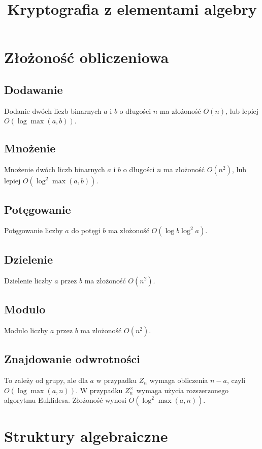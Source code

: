 \documentclass{../notatki}
\title{Kryptografia z elementami algebry}
\begin{document}
\tableofcontents

\section{Złożoność obliczeniowa}

\subsection{Dodawanie}

Dodanie dwóch liczb binarnych $a$ i $b$ o długości $n$ ma złożoność $O(n)$,
lub lepiej $O(\log \max(a, b))$.

\subsection{Mnożenie}

Mnożenie dwóch liczb binarnych $a$ i $b$ o długości $n$ ma złożoność $O(n^2)$,
lub lepiej $O(\log^2 \max(a, b))$.

\subsection{Potęgowanie}

Potęgowanie liczby $a$ do potęgi $b$ ma złożoność $O(\log b \log^2 a)$.

\subsection{Dzielenie}

Dzielenie liczby $a$ przez $b$ ma złożoność $O(n^2)$.

\subsection{Modulo}

Modulo liczby $a$ przez $b$ ma złożoność $O(n^2)$.

\subsection{Znajdowanie odwrotności}

To zależy od grupy, ale dla $a$ w przypadku $Z_n$ wymaga obliczenia
$n - a$, czyli $O(\log \max(a, n))$. W przypadku $Z_n^\times$ wymaga użycia
rozszerzonego algorytmu Euklidesa. Złożoność wynosi $O(\log^2 \max(a, n))$.

\section{Struktury algebraiczne}
\end{document}
